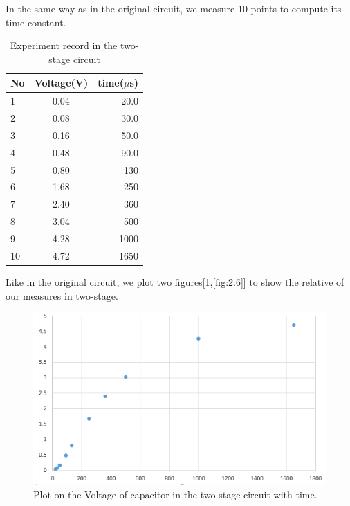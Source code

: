 \phantom{ } In the same way as in the original circuit, we measure 10 points to compute its time constant.\\

\begin{table}[!htbp]\centering
	\caption{Experiment record in the two-stage circuit}
	\renewcommand\arraystretch{1.5}
	\begin{tabular}{lcr}
		\toprule
		No		&Voltage(V)	&time($\mu$s)	\\
		\midrule
		1		&0.04		&20.0		\\

		2		&0.08		&30.0		\\
		
		3		&0.16		&50.0		\\
		
		4		&0.48		&90.0		\\
		
		5		&0.80		&130		\\
		
		6		&1.68		&250		\\
		
		7		&2.40		&360		\\
		
		8		&3.04		&500		\\
		
		9		&4.28		&1000		\\
		
		10		&4.72		&1650		\\
		\bottomrule
	\end{tabular}
\end{table}

\phantom{ } Like in the original circuit, we plot two figures[\ref{fig:2.5},\ref{fig:2.6}] to show the relative of our measures in two-stage.

\begin{figure}[!htbp]
	\centering %
	\includegraphics[width=\linewidth]{images/2_5.PNG} %
	\caption{Plot on the Voltage of capacitor in the two-stage circuit with time.} %
	\label{fig:2.5} %
\end{figure}

